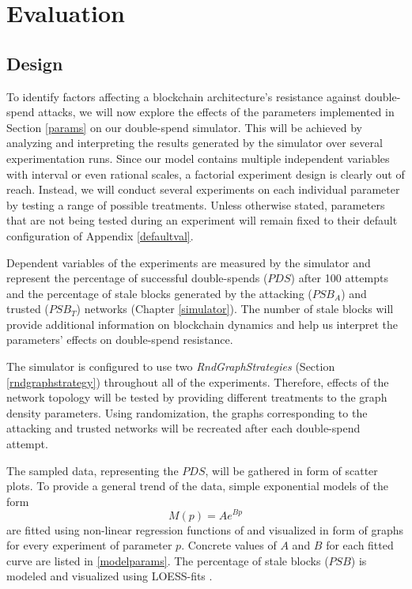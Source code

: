 \documentclass[a4paper,12pt,twoside]{report}
\begin{document}
\chapter{Evaluation} \label{eval}

\section{Design} \label{design}
To identify factors affecting a blockchain architecture's resistance against double-spend attacks, we will now explore the effects of the parameters implemented in Section \ref{params} on our double-spend simulator. This will be achieved by analyzing and interpreting the results generated by the simulator over several experimentation runs. Since our model contains multiple independent variables with interval or even rational scales, a factorial experiment design is clearly out of reach. Instead, we will conduct several experiments on each individual parameter by testing a range of possible treatments. Unless otherwise stated, parameters that are not being tested during an experiment will remain fixed to their default configuration of Appendix \ref{defaultval}. 

Dependent variables of the experiments are measured by the simulator and represent the percentage of successful double-spends ($PDS$) after 100 attempts and the percentage of stale blocks generated by the attacking ($PSB_{A}$) and trusted ($PSB_{T}$) networks (Chapter \ref{simulator}). The number of stale blocks will provide additional information on blockchain dynamics and help us interpret the parameters' effects on double-spend resistance. 

The simulator is configured to use two \textit{RndGraphStrategies} (Section \ref{rndgraphstrategy}) throughout all of the experiments. Therefore, effects of the network topology will be tested by providing different treatments to the graph density parameters. Using randomization, the graphs corresponding to the attacking and trusted networks will be recreated after each double-spend attempt. 

The sampled data, representing the $PDS$, will be gathered in form of scatter plots. To provide a general trend of the data, simple exponential models of the form
\begin{equation}\label{model}
M(p) = Ae^{Bp}
\end{equation}
are fitted using non-linear regression functions of \cite{nlxb} and visualized in form of graphs for every experiment of parameter $p$. Concrete values of $A$ and $B$ for each fitted curve are listed in \autoref{modelparams}. The percentage of stale blocks ($PSB$) is modeled and visualized using LOESS-fits \cite{loess,r}. 
\end{document}
